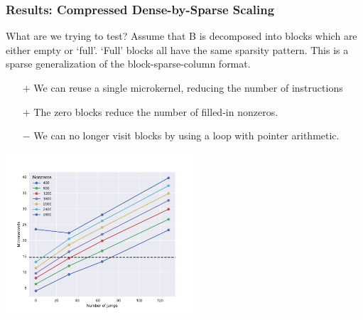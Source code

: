 \documentclass[9pt]{beamer}
\begin{document}
\begin{frame}[fragile]
  \frametitle{Results: Compressed Dense-by-Sparse Scaling}

  What are we trying to test? 
  Assume that B is decomposed into blocks which are either empty or `full'. `Full' blocks all have the same sparsity pattern. This is a sparse generalization of the block-sparse-column format.

  \begin{itemize}
  \item[$+$] We can reuse a single microkernel, reducing the number of instructions
  \item[$+$] The zero blocks reduce the number of filled-in nonzeros.
  \item[$-$] We can no longer visit blocks by using a loop with pointer arithmetic.
  \end{itemize}

  \centering
  \includegraphics[height=6cm]{images/jump_penalty_new.pdf}

\end{frame}
\end{document}
